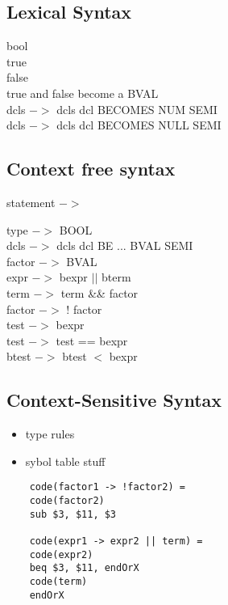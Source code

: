 \documentclass[12pt]{article}
\begin{document}
	\subsection*{Lexical Syntax}
	bool\\
	true\\
	false\\
	true and false become a BVAL\\
	
	dcls $->$ dcls dcl BECOMES NUM SEMI\\
	dcls $->$ dcls dcl BECOMES NULL SEMI\\
	
	\subsection*{Context free syntax}
	statement $->$
	
	type $->$ BOOL\\
	dcls $->$ dcls dcl BE ... BVAL SEMI\\
	factor $->$ BVAL\\
	expr $->$ bexpr $||$ bterm\\
	term $->$ term \&\& factor\\
	factor $->$ ! factor\\
	test $->$ bexpr\\
	test $->$ test == bexpr\\
	btest $->$ btest $<$ bexpr\\
	
	\subsection*{Context-Sensitive Syntax}
	
	\begin{itemize}
		\item type rules
		\item sybol table stuff
	\end{itemize}
	
	\begin{verbatim}
	code(factor1 -> !factor2) =
	code(factor2)
	sub $3, $11, $3
	
	code(expr1 -> expr2 || term) = 
	code(expr2)
	beq $3, $11, endOrX
	code(term)
	endOrX
	\end{verbatim}
\end{document}
